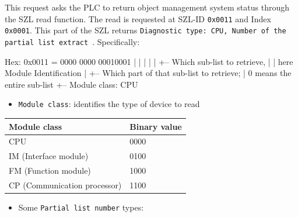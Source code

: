 ﻿\documentclass[../main.tex]{subfiles}
\begin{document}
\begin{enumerate}
This request asks the PLC to return object management system status through the SZL read function. The read is requested at SZL-ID \texttt{0x0011} and Index \texttt{0x0001}. This part of the SZL returns \texttt{Diagnostic type: CPU, Number of the partial list extract}~\cite{inprotech_s7comm_security}. Specifically:




\begin{packetdump}
Hex: 0x0011 =   0000    0000    00010001
                |       |       |
                |       |       +-- Which sub-list to retrieve,
                |       |           here Module Identification
                |       +-- Which part of that sub-list to retrieve;
                |           0 means the entire sub-list
                +-- Module class: CPU
\end{packetdump}


\begin{itemize}
    \item \texttt{Module class}: identifies the type of device to read
\end{itemize}


\begin{table}[H]
    \centering
    \footnotesize
    \begin{tabular}{|l|l|}
        \hline
        \textbf{Module class} & \textbf{Binary value} \\
        \hline
        CPU & 0000 \\
        \hline
        IM (Interface module) & 0100 \\
        \hline
        FM (Function module) & 1000 \\
        \hline
        CP (Communication processor) & 1100 \\
        \hline
    \end{tabular}
\end{table}


\begin{itemize}
    \item Some \texttt{Partial list number} types:
\end{itemize}



\end{enumerate}
\end{document}
